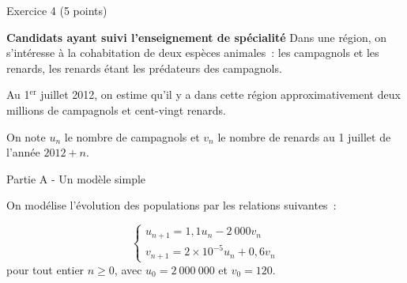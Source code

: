
\begin{h2}Exercice 4 (5 points)\end{h2}
\textbf{Candidats ayant suivi l'enseignement de spécialité}
\medskip
Dans une région, on s'intéresse à la cohabitation de deux espèces animales~: les campagnols et les
renards, les renards étant les prédateurs des campagnols.
\par
Au 1$^{\text{er}}$ juillet 2012, on estime qu'il y a dans cette région approximativement deux millions de campagnols et cent-vingt renards.
\par
On note $u_n$ le nombre de campagnols et $v_n$ le nombre de renards au 1 juillet de l'année $2012+ n$.
\bigskip
\begin{center}\begin{h3}Partie A - Un modèle simple \end{h3}\end{center}
\medskip
On modélise l'évolution des populations par les relations suivantes~:
\par
\[\left\{\begin{array}{l}
          u_{n+1} = 1,1u_n - 2~000v_n\\
          v_{n+1}= 2 \times 10^{-5}u_n + 0,6v_n
\end{array}\right.\]
pour tout entier $n \geqslant 0$, avec $u_0 = 2~000~000$ et $v_0 = 120$.
\medskip
